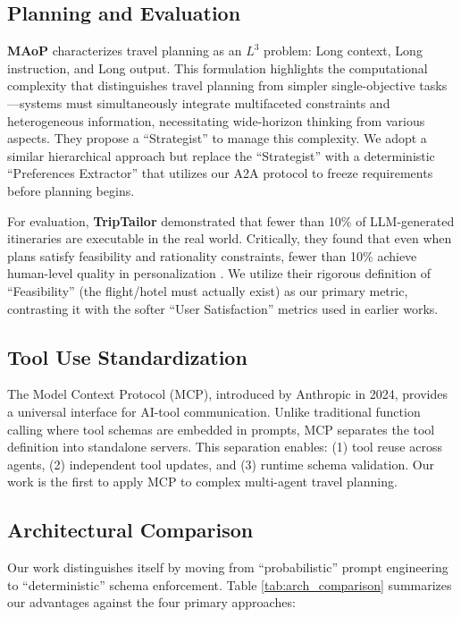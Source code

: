 \documentclass[10pt,twocolumn]{article}
\begin{document}
\subsection{Planning and Evaluation}
\textbf{MAoP} \cite{yang2025planyourtravel} characterizes travel planning as an $L^3$ problem: Long context, Long instruction, and Long output. This formulation highlights the computational complexity that distinguishes travel planning from simpler single-objective tasks---systems must simultaneously integrate multifaceted constraints and heterogeneous information, necessitating wide-horizon thinking from various aspects. They propose a ``Strategist'' to manage this complexity. We adopt a similar hierarchical approach but replace the ``Strategist'' with a deterministic ``Preferences Extractor'' that utilizes our A2A protocol to freeze requirements before planning begins.

For evaluation, \textbf{TripTailor} \cite{shen2025triptailor} demonstrated that fewer than 10\% of LLM-generated itineraries are executable in the real world. Critically, they found that even when plans satisfy feasibility and rationality constraints, fewer than 10\% achieve human-level quality in personalization \cite{dhote2025smart}. We utilize their rigorous definition of ``Feasibility'' (the flight/hotel must actually exist) as our primary metric, contrasting it with the softer ``User Satisfaction'' metrics used in earlier works.

\subsection{Tool Use Standardization}
The Model Context Protocol (MCP), introduced by Anthropic in 2024, provides a universal interface for AI-tool communication. Unlike traditional function calling where tool schemas are embedded in prompts, MCP separates the tool definition into standalone servers. This separation enables: (1) tool reuse across agents, (2) independent tool updates, and (3) runtime schema validation. Our work is the first to apply MCP to complex multi-agent travel planning.

\subsection{Architectural Comparison}

Our work distinguishes itself by moving from ``probabilistic'' prompt engineering to ``deterministic'' schema enforcement. Table \ref{tab:arch_comparison} summarizes our advantages against the four primary approaches:
\end{document}
